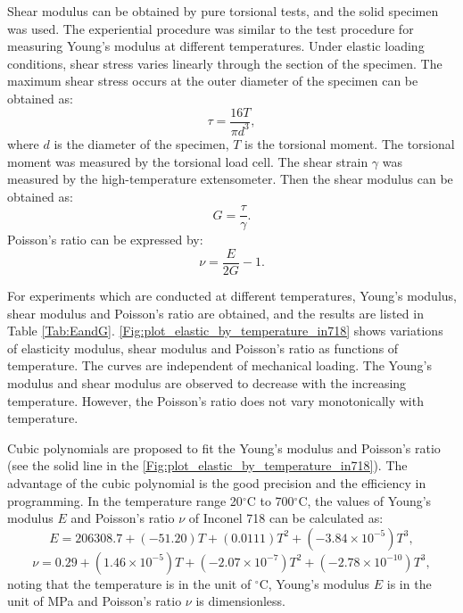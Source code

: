 Shear modulus can be obtained by pure torsional tests, and the solid specimen was used.
The experiential procedure was similar to the test procedure for measuring Young's modulus at different temperatures.
Under elastic loading conditions, shear stress varies linearly through the section of the specimen.
The maximum shear stress occurs at the outer diameter of the specimen can be obtained as:
\begin{equation}
\tau=\frac{{16T}}{\pi d^3},
\end{equation}
where $d$ is the diameter of the specimen, $T$ is the torsional moment.
The torsional moment was measured by the torsional load cell.
The shear strain $\gamma$ was measured by the high-temperature extensometer.
Then the shear modulus can be obtained as:
\begin{equation}
G=\frac{\tau}{\gamma}.
\end{equation}
Poisson's ratio can be expressed by:
\begin{equation}
\nu  = \frac{E}{{2G}} - 1.
\end{equation}

For experiments which are conducted at different temperatures, Young's modulus, shear modulus and Poisson's ratio are obtained, and the results are listed in Table \ref{Tab:EandG}.
\ref{Fig:plot_elastic_by_temperature_in718} shows variations of elasticity modulus, shear modulus and Poisson's ratio as functions of temperature. The curves are independent of mechanical loading. The Young's modulus and shear modulus are observed to decrease with the increasing temperature. However, the Poisson's ratio does not vary monotonically with temperature.

Cubic polynomials are proposed to fit the Young's modulus and Poisson's ratio (see the solid line in the \ref{Fig:plot_elastic_by_temperature_in718}).
The advantage of the cubic polynomial is the good precision and the efficiency in programming.
In the temperature range 20$^{\circ}$C to 700$^{\circ}$C, the values of Young's modulus $E$ and Poisson's ratio $\nu$ of Inconel 718 can be calculated as:
\begin{equation}
E=206308.7+(-51.20)T+(0.0111)T^2+(-3.84\times10^{-5})T^3,
\label{Equ:polynomial_of_E}
\end{equation}
\begin{equation}
\nu=0.29+(1.46\times10^{-5})T+(-2.07\times10^{-7})T^2+(-2.78\times10^{-10})T^3,
\label{Equ:polynomial_of_nu}
\end{equation}
noting that the temperature is in the unit of $^\circ$C, Young's modulus $E$ is in the unit of MPa and Poisson's ratio $\nu$ is dimensionless.

